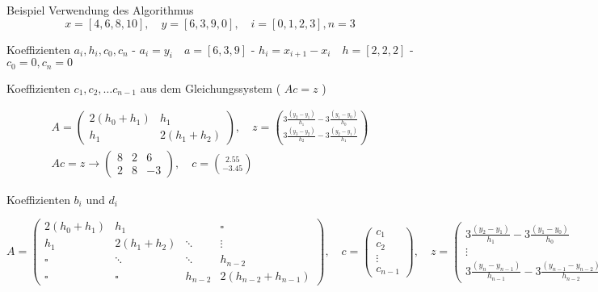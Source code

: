 \begin{example2}{Beispiel Verwendung des Algorithmus}
    $$
    x=[4,6,8,10], \quad y=[6,3,9,0], \quad i=[0,1,2,3], n=3
    $$


    Koeffizienten $a_i, h_i, c_0, c_n$
    - $a_i=y_i \quad a=[6,3,9]$
    - $h_i=x_{i+1}-x_i \quad h=[2,2,2]$
    - $c_0=0, c_n=0$

    Koeffizienten $c_1, c_2, \ldots c_{n-1}$ aus dem Gleichungssystem ( $A c=z$ )

    $$
    \begin{gathered}
    A=\left(\begin{array}{cc}
    2\left(h_0+h_1\right) & h_1 \\
    h_1 & 2\left(h_1+h_2\right)
    \end{array}\right), \quad z=\binom{3 \frac{\left(y_2-y_1\right)}{h_1}-3 \frac{\left(y_1-y_0\right)}{h_0}}{3 \frac{\left(y_3-y_2\right)}{h_2}-3 \frac{\left(y_2-y_1\right)}{h_1}} \\
    A c=z \rightarrow\left(\begin{array}{ll|c}
    8 & 2 & 6 \\
    2 & 8 & -3
    \end{array}\right), \quad c=\binom{2.55}{-3.45}
    \end{gathered}
    $$


    Koeffizienten $b_i$ und $d_i$

    \tcblower

    $$
    A=\left(\begin{array}{cccc}
    2\left(h_0+h_1\right) & h_1 & & \square \\
    h_1 & 2\left(h_1+h_2\right) & \ddots & \vdots \\
    \square & \ddots & \ddots & h_{n-2} \\
    \square & \square & h_{n-2} & 2\left(h_{n-2}+h_{n-1}\right)
    \end{array}\right), \quad c=\left(\begin{array}{c}
    c_1 \\
    c_2 \\
    \vdots \\
    c_{n-1}
    \end{array}\right), \quad z=\left(\begin{array}{c}
    3 \frac{\left(y_2-y_1\right)}{h_1}-3 \frac{\left(y_1-y_0\right)}{h_0} \\
    \vdots \\
    3 \frac{\left(y_n-y_{n-1}\right)}{h_{n-1}}-3 \frac{\left(y_{n-1}-y_{n-2}\right)}{h_{n-2}}
    \end{array}\right)
    $$
\end{example2}

